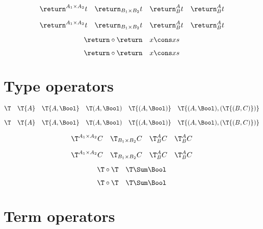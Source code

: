 \documentclass{article}
\def\termfont{\mathbf}
\begin{document}
\begin{verbatim*}
\[
\return^{A_1\times A_2}{t}\quad
\return_{B_1\times B_2}{t}\quad
\return^A_B{t}\quad
\return_B^A{t}
\]
\end{verbatim*}
%
\[
  \return^{A_1 \times A_2}{t} \quad
  \return_{B_1 \times B_2}{t} \quad
  \return^A_B{t}              \quad
  \return_B^A{t}
\]

\begin{verbatim*}
\[
\return \circ \return\quad
x \cons xs
\]
\end{verbatim*}
%
\[
  \return \circ \return\quad
  x \cons xs
\]

\section{Type operators}

\begin{verbatim*}
\def\typefont{\mathsf}

\DeclareTypeInfix{\Sum}{+}
\end{verbatim*}

\begin{verbatim*}
\[
\T\quad
\T{A}\quad
\T{A,\Bool}\quad
\T(A,\Bool)\quad
\T{{(A,\Bool)}}\quad
\T{{(A,\Bool)},(\T{(B,C)})}
\]
\end{verbatim*}
%
\[
  \T              \quad
  \T{A}           \quad
  \T{A,\Bool}     \quad
  \T(A,\Bool)     \quad
  \T{{(A,\Bool)}} \quad
  \T{{(A,\Bool)},(\T{(B,C)})}
\]

\begin{verbatim*}
\[
\T^{A_1\times A_2}{C}\quad
\T_{B_1\times B_2}{C}\quad
\T^A_B{C}\quad
\T_B^A{C}
\]
\end{verbatim*}
%
\[
  \T^{A_1 \times A_2}{C} \quad
  \T_{B_1 \times B_2}{C} \quad
  \T^A_B{C}              \quad
  \T_B^A{C}
\]

\begin{verbatim*}
\[
\T \circ \T\quad
\T \Sum \Bool
\]
\end{verbatim*}
%
\[
  \T \circ \T\quad
  \T \Sum \Bool
\]

\section{Term operators}

\begin{verbatim*}
\def\termfont{\mathbf}

\DeclareTermInfix{\conj}{\wedge}
\end{verbatim*}
\end{document}
